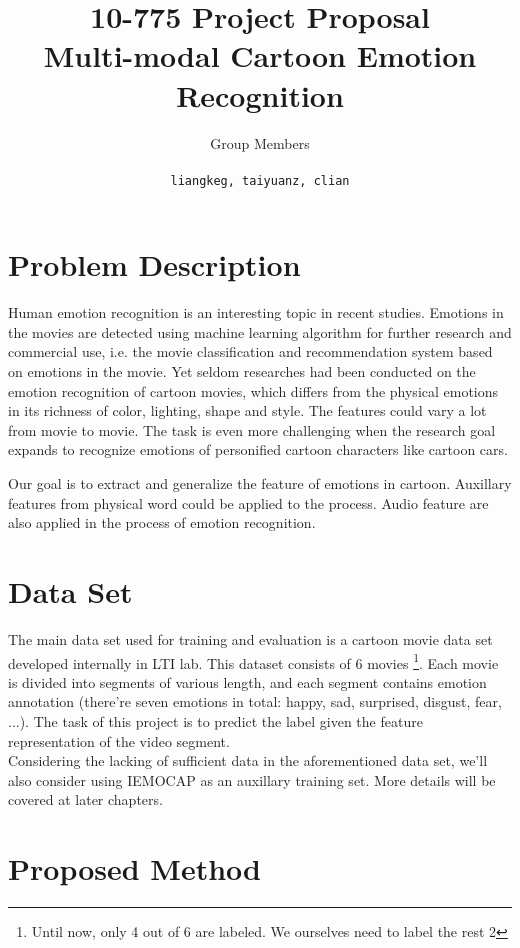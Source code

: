 \documentclass[a4page]{article}
\author{Group Members \\ \text{Liangke Gui, Taiyuan Zhang, Chengliang Lian} \\ \texttt{liangkeg, taiyuanz, clian}
}
\title{10-775 Project Proposal \\ Multi-modal Cartoon Emotion Recognition}
\date{}
\begin{document}
\maketitle


\section{Problem Description}
Human emotion recognition is an interesting topic in recent studies. Emotions in the movies are detected using machine learning algorithm for further research and commercial use, i.e. the movie classification and recommendation system based on emotions in the movie. Yet seldom researches had been conducted on the emotion recognition of cartoon movies, which differs from the physical emotions in its richness of color, lighting, shape and style. The features could vary a lot from movie to movie. The task is even more challenging when the research goal expands to recognize emotions of personified cartoon characters like cartoon cars.

Our goal is to extract and generalize the feature of emotions in cartoon. Auxillary features from physical word could be applied to the process. Audio feature are also applied in the process of emotion recognition.



\section{Data Set}
The main data set used for training and evaluation is a cartoon movie data set developed internally in LTI lab. This dataset consists of 6 movies \footnote{Until now, only 4 out of 6 are labeled. We ourselves need to label the rest 2}. Each movie is divided into segments of various length, and each segment contains emotion annotation (there're seven emotions in total: happy, sad, surprised, disgust, fear, ...). The task of this project is to predict the label given the feature representation of the video segment. \\

Considering the lacking of sufficient data in the aforementioned data set, we'll also consider using IEMOCAP\cite{busso2008iemocap} as an auxillary training set. More details will be covered at later chapters.


\section{Proposed Method}
\end{document}
